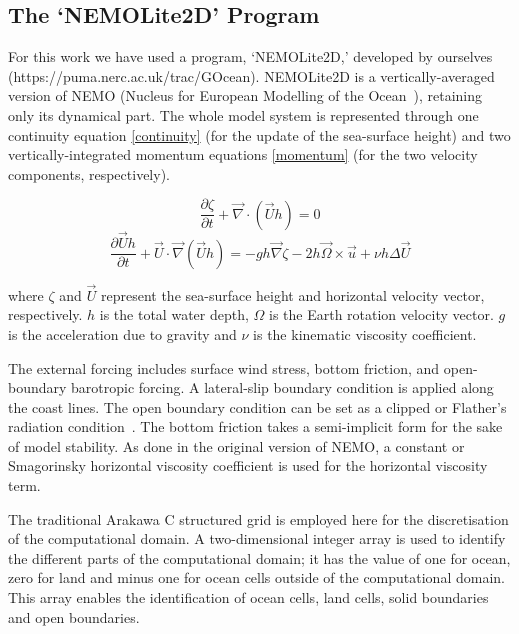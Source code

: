 \documentclass[gmdd, manuscript]{copernicus}
\begin{document}
\subsection{The `NEMOLite2D' Program}

For this work we have used a program, `NEMOLite2D,' developed by
ourselves (https://puma.nerc.ac.uk/trac/GOcean).  NEMOLite2D is a
vertically-averaged version of NEMO (Nucleus for European Modelling of
the Ocean~\citep{nemo}), retaining only its dynamical part. The whole
model system is represented through one continuity equation
\eqref{continuity} (for the update of the sea-surface height) and two
vertically-integrated momentum equations \eqref{momentum} (for the two
velocity components, respectively).

\begin{equation}\label{continuity}
 \frac{\partial \zeta}{\partial t} + \vec{\nabla} \cdot (\vec{U}h) = 0
\end{equation}
\begin{equation}\label{momentum}
 \frac{\partial \vec{U}h}{\partial t}
   + \vec{U} \cdot \vec{\nabla} (\vec{U}h) = 
   - gh \vec{\nabla} \zeta - 2h \vec{\Omega} \times \vec{u}
   + \nu h \Delta \vec{U}
\end{equation}

where $\zeta$ and $\vec{U}$ represent the sea-surface height and
horizontal velocity vector, respectively. $h$ is the total water
depth, $\Omega$ is the Earth rotation velocity vector.  $g$ is the
acceleration due to gravity and $\nu$ is the kinematic viscosity coefficient.

The external forcing includes surface wind stress, bottom friction,
and open-boundary barotropic forcing. A lateral-slip boundary
condition is applied along the coast lines. The open boundary
condition can be set as a clipped or Flather's radiation
condition~\citep{flather76}. The bottom friction takes a semi-implicit
form for the sake of model stability. As done in the original version
of NEMO, a constant or Smagorinsky horizontal viscosity coefficient is
used for the horizontal viscosity term.

The traditional Arakawa C structured grid is employed here for the
discretisation of the computational domain. A two-dimensional integer
array is used to identify the different parts of the computational
domain; it has the value of one for ocean, zero for land and minus
one for ocean cells outside of the computational domain. This array
enables the identification of ocean cells, land cells, solid boundaries
and open boundaries.
\end{document}
